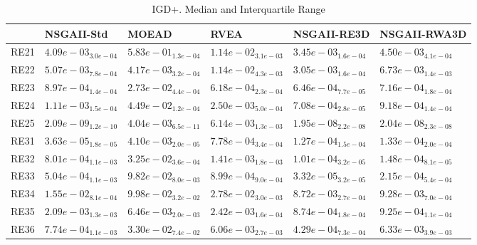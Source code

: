 \documentclass{article}
\begin{document}
\begin{table}
\caption{IGD+. Median and Interquartile Range}
\label{table: IGD+}
\centering
\begin{scriptsize}
\begin{tabular}{llllll}
\hline & NSGAII-Std & MOEAD & RVEA & NSGAII-RE3D &  NSGAII-RWA3D\\
\hline 
RE21 & \cellcolor{gray25}$  4.09e-03_{ 3.0e-04}$ & $  5.83e-01_{ 1.3e-04}$ & $  1.14e-02_{ 3.1e-03}$ & \cellcolor{gray95}$  3.45e-03_{ 1.6e-04}$ & $  4.50e-03_{ 4.1e-04}$ \\
RE22 & $  5.07e-03_{ 7.8e-04}$ & \cellcolor{gray25}$  4.17e-03_{ 3.2e-04}$ & $  1.14e-02_{ 4.3e-03}$ & \cellcolor{gray95}$  3.05e-03_{ 1.6e-04}$ & $  6.73e-03_{ 1.4e-03}$ \\
RE23 & $  8.97e-04_{ 1.4e-04}$ & $  2.73e-02_{ 4.4e-04}$ & \cellcolor{gray95}$  6.18e-04_{ 2.3e-04}$ & \cellcolor{gray25}$  6.46e-04_{ 7.7e-05}$ & $  7.16e-04_{ 1.8e-04}$ \\
RE24 & $  1.11e-03_{ 1.5e-04}$ & $  4.49e-02_{ 1.2e-04}$ & $  2.50e-03_{ 5.0e-04}$ & \cellcolor{gray95}$  7.08e-04_{ 2.8e-05}$ & \cellcolor{gray25}$  9.18e-04_{ 1.4e-04}$ \\
RE25 & \cellcolor{gray95}$  2.09e-09_{ 1.2e-10}$ & $  4.04e-03_{ 6.5e-11}$ & $  6.14e-03_{ 1.3e-03}$ & \cellcolor{gray25}$  1.95e-08_{ 2.2e-08}$ & $  2.04e-08_{ 2.3e-08}$ \\
RE31 & \cellcolor{gray95}$  3.63e-05_{ 1.8e-05}$ & $  4.10e-03_{ 2.0e-05}$ & $  7.78e-04_{ 3.4e-04}$ & \cellcolor{gray25}$  1.27e-04_{ 1.5e-04}$ & $  1.33e-04_{ 2.0e-04}$ \\
RE32 & $  8.01e-04_{ 1.1e-03}$ & $  3.25e-02_{ 3.6e-04}$ & $  1.41e-03_{ 1.8e-03}$ & \cellcolor{gray95}$  1.01e-04_{ 3.2e-05}$ & \cellcolor{gray25}$  1.48e-04_{ 8.1e-05}$ \\
RE33 & $  5.04e-04_{ 1.1e-03}$ & $  9.82e-02_{ 8.0e-03}$ & $  8.99e-04_{ 9.0e-04}$ & \cellcolor{gray95}$  3.32e-05_{ 3.2e-05}$ & \cellcolor{gray25}$  2.15e-04_{ 5.4e-04}$ \\
RE34 & $  1.55e-02_{ 8.1e-04}$ & $  9.98e-02_{ 3.2e-02}$ & $  2.78e-02_{ 3.0e-03}$ & \cellcolor{gray95}$  8.72e-03_{ 2.7e-04}$ & \cellcolor{gray25}$  9.28e-03_{ 7.0e-04}$ \\
RE35 & $  2.09e-03_{ 1.3e-03}$ & $  6.46e-03_{ 2.0e-03}$ & $  2.42e-03_{ 1.6e-04}$ & \cellcolor{gray95}$  8.74e-04_{ 1.8e-04}$ & \cellcolor{gray25}$  9.25e-04_{ 1.1e-04}$ \\
RE36 & \cellcolor{gray25}$  7.74e-04_{ 1.1e-03}$ & $  3.30e-02_{ 7.4e-02}$ & $  6.06e-03_{ 2.7e-03}$ & \cellcolor{gray95}$  4.29e-04_{ 7.3e-04}$ & $  6.33e-03_{ 3.9e-03}$ \\

\end{tabular}
\end{scriptsize}
\end{table}
\end{document}
